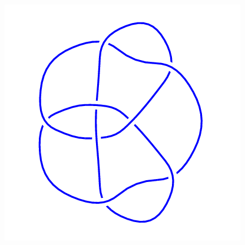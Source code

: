 \begin{figure}[H]
\begin{minipage}[b]{.18\linewidth}
    \end{minipage}
    \begin{minipage}[b]{.18\linewidth}
        \centering
        \includegraphics[width=\linewidth]{../data/8_16.png}
    \end{minipage}
\end{figure}
